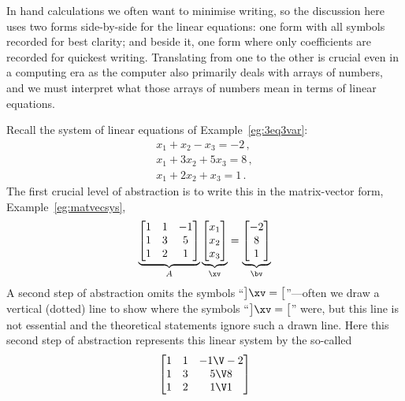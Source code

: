 In hand calculations we often want to minimise writing, so the discussion here uses two forms side-by-side for the linear equations: one form with all symbols recorded for best clarity; and beside it, one form where only coefficients are recorded for quickest writing.
Translating from one to the other is crucial even in a computing era as the computer also primarily deals with arrays of numbers, and we must interpret what those arrays of numbers mean in terms of linear equations.

\begin{example} \label{eg:}
Recall the system of linear equations of Example~\ref{eg:3eq3var}:
\begin{equation*}
\begin{array}{l}
x_1+x_2-x_3=-2\,,\\
x_1+3x_2+5x_3=8\,,\\
x_1+2x_2+x_3=1\,.
\end{array}
\end{equation*}
The first crucial level of abstraction is to write this in the matrix-vector form, Example~\ref{eg:matvecsys},
\begin{equation*}
\underbrace{\begin{bmatrix} 1&1&-1\\ 1&3&5\\1&2&1 \end{bmatrix}}_A
\underbrace{\begin{bmatrix} x_1\\x_2\\x_3 \end{bmatrix}}_\xv
=\underbrace{\begin{bmatrix} -2\\8\\1 \end{bmatrix}}_\bv 
\end{equation*}
A second step of abstraction omits the symbols ``\(\big]\xv=\big[\)''---often we draw a vertical (dotted) line to show where the symbols ``\(\big]\xv=\big[\)'' were, but this line is not essential and the theoretical statements ignore such a drawn line.
Here this second step of abstraction represents this linear system by the so-called 
\begin{equation*}
\begin{bmatrix} 1&1&-1\V -2\\ 1&3&5\V 8\\1&2&1\V 1 \end{bmatrix}
\end{equation*}
\end{example}


